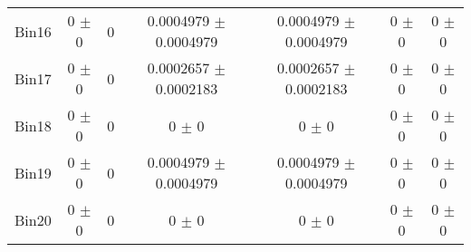 \begin{tabular}{@{\extracolsep{4pt}}lcccccc@{}}
     Bin16 & 0 $\pm$ 0 & 0 & 0.0004979 $\pm$ 0.0004979 & 0.0004979 $\pm$ 0.0004979 & 0 $\pm$ 0 & 0 $\pm$ 0 \\ 
     Bin17 & 0 $\pm$ 0 & 0 & 0.0002657 $\pm$ 0.0002183 & 0.0002657 $\pm$ 0.0002183 & 0 $\pm$ 0 & 0 $\pm$ 0 \\ 
     Bin18 & 0 $\pm$ 0 & 0 & 0 $\pm$ 0 & 0 $\pm$ 0 & 0 $\pm$ 0 & 0 $\pm$ 0 \\ 
     Bin19 & 0 $\pm$ 0 & 0 & 0.0004979 $\pm$ 0.0004979 & 0.0004979 $\pm$ 0.0004979 & 0 $\pm$ 0 & 0 $\pm$ 0 \\ 
     Bin20 & 0 $\pm$ 0 & 0 & 0 $\pm$ 0 & 0 $\pm$ 0 & 0 $\pm$ 0 & 0 $\pm$ 0 \\ 
\hline\hline
  \end{tabular}
